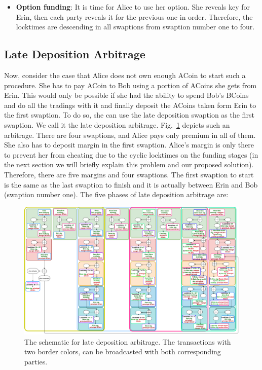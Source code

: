 \begin{itemize}
    \item \textbf{Option funding}: It is time for Alice to use her option. She reveals \Atwo key for Erin, then each party reveals it for the previous one in order. Therefore, the locktimes are descending in all swaptions from swaption number one to four.
\end{itemize}

\subsection{Late Deposition Arbitrage}
\label{sec:margined_arb}
Now, consider the case that Alice does not own enough ACoin to start such a procedure. She has to pay ACoin to Bob using a portion of ACoins she gets from Erin. This would only be possible if she had the ability to spend Bob's BCoins and do all the tradings with it and finally deposit the ACoins taken form Erin to the first swaption. To do so, she can use the late deposition swaption as the first swaption. We call it the late deposition arbitrage. Fig.~\ref{fig:margined_arb} depicts such an arbitrage. There are four swaptions, and Alice pays only premium in all of them. She also has to deposit margin in the first swaption. Alice's margin is only there to prevent her from cheating due to the cyclic locktimes on the funding stages (in the next section we will briefly explain this problem and our proposed solution). Therefore, there are five margins and four swaptions. The first swaption to start is the same as the last swaption to finish and it is actually between Erin and Bob (swaption number one). The five phases of late deposition arbitrage are: 

\begin{figure}
    \centering
    \includegraphics[width=\textwidth]{figures/arbitrage-late.pdf}
    \caption{The schematic for late deposition arbitrage. The transactions with two border colors, can be broadcasted with both corresponding parties.}
    \label{fig:margined_arb}
\end{figure}


